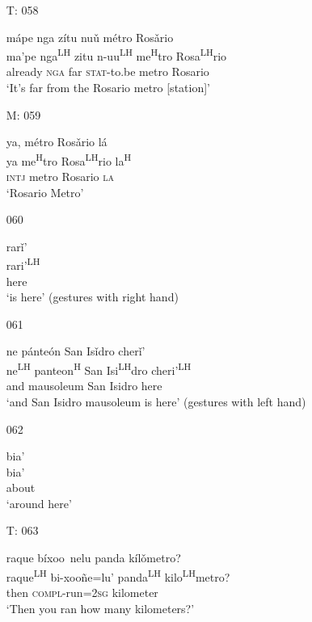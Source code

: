 \begin{itemize}
\item[T: 058]
 
\glll   m\'{a}pe nga z\'{i}tu nu\v{u} m\'{e}tro Ros\v{a}rio\\
 ma'pe nga\textsuperscript{LH} zitu n-uu\textsuperscript{LH} me\textsuperscript{H}tro Rosa\textsuperscript{LH}rio\\
 already \textsc{nga} far \textsc{stat}-to.be metro Rosario\\
\glt `It's far from the Rosario metro [station]'
 

\item[M: 059]
 
\glll   ya, m\'{e}tro Ros\v{a}rio l\'{a} \\
ya me\textsuperscript{H}tro Rosa\textsuperscript{LH}rio la\textsuperscript{H}\\
\textsc{intj} metro Rosario \textsc{la}\\
\glt `Rosario Metro' 

 

\item[060]
  
\glll   rar\v{i}' \\
rari'\textsuperscript{LH}\\
here\\
\glt `is here' (gestures with right hand) 

 

\item[061]
 
\glll   ne p\'{a}nte\'{o}n San Is\v{i}dro cher\v{i}' \\
ne\textsuperscript{LH} panteon\textsuperscript{H} San Isi\textsuperscript{LH}dro cheri'\textsuperscript{LH} \\
and mausoleum San Isidro here\\
\glt `and San Isidro mausoleum is here' (gestures with left hand) 
 


\item[062]
 
\glll   bia'\\
bia'\\
about\\
\glt `around here'
 


\item[T: 063]
 
raque b\'{i}xoo~{n}elu panda k\'{i}l\v{o}metro?\\
  raque\textsuperscript{LH} bi-xoo\~{n}e=lu' panda\textsuperscript{LH} kilo\textsuperscript{LH}metro?\\
  then \textsc{compl}-run=\textsc{2sg} kilometer\\
\glt `Then you ran how many kilometers?'
 


\end{itemize}

